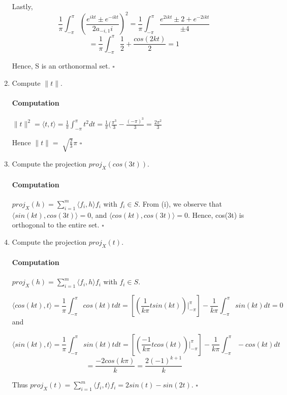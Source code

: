 \documentclass[letterpaper,12pt]{article}
\theoremstyle{definition}
\begin{document}
\begin{enumerate}[label=(\roman*)]
Lastly, $$ \frac{1}{\pi} \int_{- \pi}^{\pi} (\frac{e^{ikt} \pm e^{-ikt}}{2a_{-i,1}i})^2 = \frac{1}{\pi} \int_{- \pi}^{\pi} \frac{e^{2ikt} \pm 2 +e^{-2ikt}}{\pm 4} $$ 
$$= \frac{1}{\pi} \int_{- \pi}^{\pi} \frac{1}{2} + \frac{cos(2kt)}{2} = 1  $$ 



Hence, S is an orthonormal set. $\square$

\item Compute $\|t\|$.

\paragraph{Computation} $\|t\|^2 = \langle t , t  \rangle  = \frac{1}{\pi} \int_{- \pi}^{\pi} t^2 dt = \frac{1}{\pi} (\frac{\pi^3}{3} - \frac{(-\pi)^3}{3} = \frac{2 \pi^2}{3}$

Hence $\|t\| = \sqrt[]{\frac{2}{3}} \pi$ $\square$

\item Compute the projection $proj_X(cos(3t)).$

\paragraph{Computation} $proj_X(h) = \sum_{i = 1}^m \langle f_i , h  \rangle f_i$ with $f_i \in S$.
From (i), we observe that $\langle sin(kt) , cos(3t)  \rangle = 0$,  and $\langle cos(kt) , cos(3t)  \rangle = 0$. Hence, cos(3t) is orthogonal to the entire set. $\square$

\item Compute the projection $proj_X(t).$

\paragraph{Computation} $proj_X(h) = \sum_{i = 1}^m \langle f_i , h  \rangle f_i$ with $f_i \in S$.

$$\langle cos(kt) , t  \rangle  = \frac{1}{\pi} \int_{- \pi}^{\pi} cos(kt) t dt   = [(\frac{1}{k \pi} tsin(kt))\vert_{-\pi}^{\pi}] - \frac{1}{k \pi} \int_{- \pi}^{\pi} sin(kt) dt = 0$$
and 

$$ \langle sin(kt) , t  \rangle  = \frac{1}{\pi} \int_{- \pi}^{\pi} sin(kt) t dt   = [(\frac{- 1}{k \pi} tcos(kt))\vert_{-\pi}^{\pi}] - \frac{1}{k \pi} \int_{- \pi}^{\pi}  - cos(kt)  dt$$
$$=  \frac{- 2 cos(k\pi)}{k} =  \frac{ 2(-1)^{k+1} }{k}  $$

Thus $proj_X(t) = \sum_{i = 1}^m \langle f_i , t  \rangle f_i
= 2 sin(t) - sin(2t) $. $\square$

\end{enumerate} 
\end{document}
